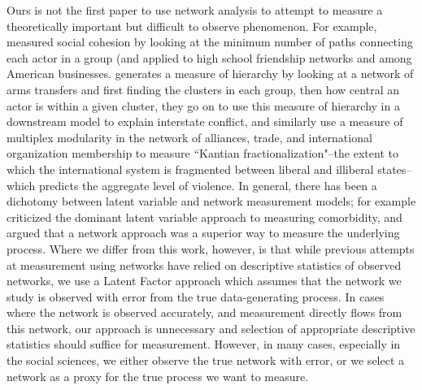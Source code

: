 Ours is not the first paper to use network analysis to attempt to measure a theoretically important but difficult to observe phenomenon. For example, \citet{moody:white:2003} measured social cohesion by looking at the minimum number of paths connecting each actor in a group (and applied to high school friendship networks and among American businesses. \citet{beardsley:etal:2018} generates a measure of hierarchy by looking at a network of arms transfers and first finding the clusters in each group,  then how central an actor is within a given cluster, they go on to use this measure of hierarchy in a downstream model to explain interstate conflict, and similarly \citet{cranmer:etal:2015} use a measure of multiplex modularity in the network of alliances, trade, and international organization membership to measure ``Kantian fractionalization"--the extent to which the international system is fragmented between liberal and illiberal states--which predicts the aggregate level of violence. In general, there has been a dichotomy between latent variable  and network measurement models; for example \citet{cramer:etal:2010} criticized the dominant latent variable approach to measuring comorbidity, and argued that a network approach was a superior way to measure the underlying process.  Where we differ from this work, however, is that while previous attempts at measurement using networks have relied on descriptive statistics of observed networks, we use a Latent Factor approach which assumes that the network we study is observed with error from the true data-generating process.  In cases where the network is observed accurately, and measurement directly flows from this network, our approach is unnecessary and selection of appropriate descriptive statistics should suffice for measurement. However, in many cases, especially in the social sciences, we either observe the true network with error, or we select a network as a proxy for the true process we want to measure. 

